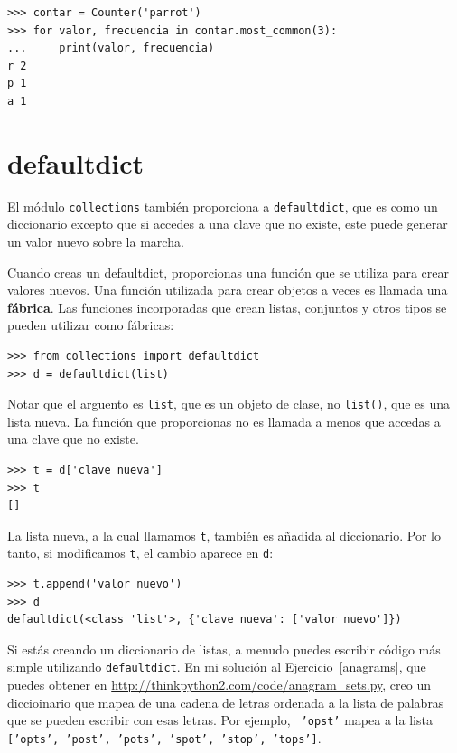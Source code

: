\documentclass[10pt]{book}
\begin{document}
\begin{verbatim}
>>> contar = Counter('parrot')
>>> for valor, frecuencia in contar.most_common(3):
...     print(valor, frecuencia)
r 2
p 1
a 1
\end{verbatim}


\section{defaultdict}

El módulo {\tt collections} también proporciona a {\tt defaultdict}, que es
como un diccionario excepto que si accedes a una clave que no existe,
este puede generar un valor nuevo sobre la marcha.

Cuando creas un defaultdict, proporcionas una función que se utiliza para
crear valores nuevos.  Una función utilizada para crear objetos a veces es
llamada una {\bf fábrica}.  Las funciones incorporadas que crean listas, conjuntos
y otros tipos se pueden utilizar como fábricas:

\begin{verbatim}
>>> from collections import defaultdict
>>> d = defaultdict(list)
\end{verbatim}

Notar que el arguento es {\tt list}, que es un objeto de clase,
no {\tt list()}, que es una lista nueva.  La función que proporcionas
no es llamada a menos que accedas a una clave que no existe.

\begin{verbatim}
>>> t = d['clave nueva']
>>> t
[]
\end{verbatim}

La lista nueva, a la cual llamamos {\tt t}, también es añadida al
diccionario.  Por lo tanto, si modificamos {\tt t}, el cambio aparece en {\tt d}:

\begin{verbatim}
>>> t.append('valor nuevo')
>>> d
defaultdict(<class 'list'>, {'clave nueva': ['valor nuevo']})
\end{verbatim}

Si estás creando un diccionario de listas, a menudo puedes escribir código
más simple utilizando {\tt defaultdict}.  En mi solución al
Ejercicio~\ref{anagrams}, que puedes obtener en
\url{http://thinkpython2.com/code/anagram_sets.py}, creo un
diccioinario que mapea de una cadena de letras ordenada a la lista de
palabras que se pueden escribir con esas letras.  Por ejemplo, {\tt
  'opst'} mapea a la lista {\tt ['opts', 'post', 'pots', 'spot',
    'stop', 'tops']}.
\end{document}

